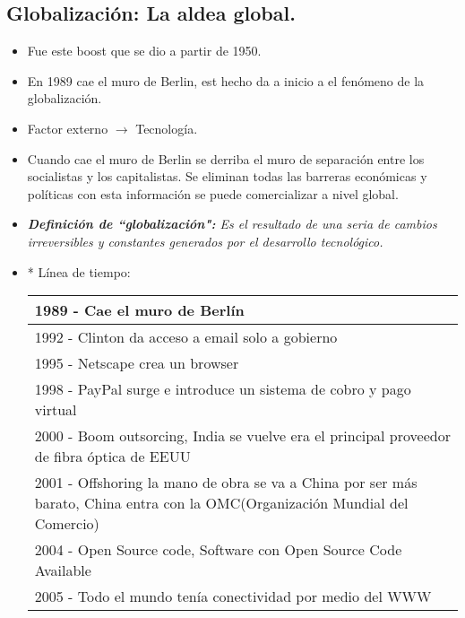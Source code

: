 \subsection{ Globalización: La aldea global.}
\begin{itemize}
    \item Fue este boost que se dio a partir de 1950.
    \item En 1989 cae el muro de Berlin, est hecho da a inicio a el fenómeno de la globalización.
    \item Factor externo $\rightarrow$ Tecnología.
    \item Cuando cae el muro de Berlin se derriba el muro de separación entre los socialistas y los capitalistas. Se eliminan todas las barreras económicas y políticas con esta información se puede comercializar a nivel global.
    \item \emph{\textbf{Definición de ``globalización":} Es el resultado de una seria de cambios irreversibles y constantes generados por el desarrollo tecnológico.}
    
    \item* Línea de tiempo: 
        \begin{center}
            \begin{tabular}{ | p{15cm} | }
                \hline
                    1989 - Cae el muro de Berlín \\ 
                    \hline
                    1992 - Clinton da acceso a email solo a gobierno  \\ 
                    \hline
                    1995 - Netscape crea un browser \\ 
                    \hline
                    1998 - PayPal surge e introduce un sistema de cobro y pago virtual \\ 
                    \hline
                    2000 - Boom outsorcing, India se vuelve era el principal proveedor de fibra óptica de EEUU \\ 
                    \hline
                    2001 - Offshoring la mano de obra se va a China por ser más barato, China entra con la OMC(Organización Mundial del Comercio) \\ 
                    \hline
                    2004 - Open Source code, Software con Open Source Code Available  \\ 
                    \hline
                    2005 - Todo el mundo tenía conectividad por medio del WWW \\ 
                \hline
            \end{tabular}
        \end{center}
    

\end{itemize}
